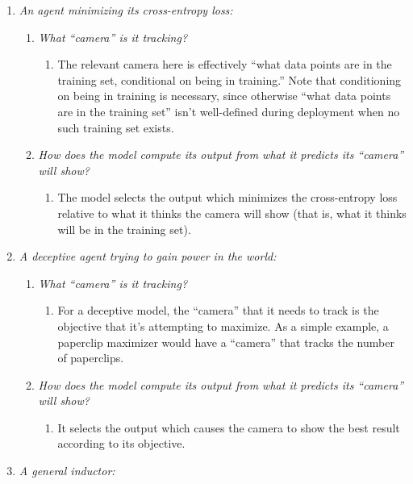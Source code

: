 \documentclass[
  onecolumn,
  natbib,
]{miri-tech-article}
\begin{document}
\begin{enumerate}
\item \textit{An agent minimizing its cross-entropy loss:}
    \begin{enumerate}
    \item \textit{What ``camera'' is it tracking?}
        \begin{enumerate}
        \item The relevant camera here is effectively ``what data points are in the training set, conditional on being in training.'' Note that conditioning on being in training is necessary, since otherwise ``what data points are in the training set'' isn't well-defined during deployment when no such training set exists.
        \end{enumerate}
    \item \textit{How does the model compute its output from what it predicts its ``camera'' will show?}
        \begin{enumerate}
        \item The model selects the output which minimizes the cross-entropy loss relative to what it thinks the camera will show (that is, what it thinks will be in the training set).
        \end{enumerate}
    \end{enumerate}
\item \textit{A deceptive agent trying to gain power in the world:}
    \begin{enumerate}
    \item \textit{What ``camera'' is it tracking?}
        \begin{enumerate}
        \item For a deceptive model, the ``camera'' that it needs to track is the objective that it's attempting to maximize. As a simple example, a paperclip maximizer would have a ``camera'' that tracks the number of paperclips.
        \end{enumerate}
    \item \textit{How does the model compute its output from what it predicts its ``camera'' will show?}
        \begin{enumerate}
        \item It selects the output which causes the camera to show the best result according to its objective.
        \end{enumerate}
    \end{enumerate}
\item \textit{A general inductor:}
    \begin{enumerate}

\end{enumerate}
\end{enumerate}
\end{document}
